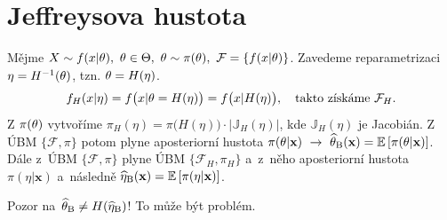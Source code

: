 \section{Jeffreysova hustota}
Mějme $X\sim f(x|\theta),~\theta\in\Theta,~\theta\sim\pi(\theta),~\mathcal{F}=\{f(x|\theta)\}$. Zavedeme reparametrizaci $\eta=H^{-1}(\theta)$, tzn. $\theta=H(\eta)$. 
$$ f_H(x|\eta)=f\big(x|\theta=H(\eta)\big)=f\big(x|H(\eta)\big),\quad\text{takto získáme }\mathcal{F}_H.$$
Z $\pi(\theta)$ vytvoříme $\pi_H(\eta)=\pi\big(H(\eta)\big)\cdot\big|\mathbb{J}_H(\eta)\big|$, kde  $\mathbb{J}_H(\eta)$ je Jacobián.
Z ÚBM $\{\mathcal{F},\pi\}$ potom plyne aposteriorní hustota $\pi(\theta|\textbf{x})~\to~\widehat{\theta}_\mathrm{B}(\textbf{x})=\mathbb{E}\left[ \pi(\theta|\textbf{x}) \right]$. Dále z~ÚBM $\{\mathcal{F},\pi\}$ plyne ÚBM $\{\mathcal{F}_H,\pi_H\}$ a~z~něho aposteriorní hustota $\pi(\eta|\textbf{x})$ a~následně $ \widehat{\eta}_\mathrm{B}(\textbf{x})=\mathbb{E}\left[ \pi(\eta|\textbf{x}) \right]$. 

Pozor na~$\widehat{\theta}_\mathrm{B}\neq H(\widehat{\eta}_\mathrm{B})$! To může být problém.

